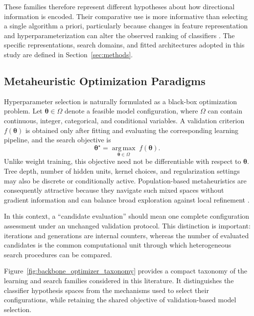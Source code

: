 These families therefore represent different hypotheses about how directional information is encoded. Their comparative use is more informative than selecting a single algorithm a priori, particularly because changes in feature representation and hyperparameterization can alter the observed ranking of classifiers \cite{nabipour2020predicting, mutinda2026hybrid}. The specific representations, search domains, and fitted architectures adopted in this study are defined in Section~\ref{sec:methods}.

\subsection{Metaheuristic Optimization Paradigms}\label{subsec:metaheuristic_paradigms}

Hyperparameter selection is naturally formulated as a black-box optimization problem. Let $\boldsymbol{\theta} \in \Omega$ denote a feasible model configuration, where $\Omega$ can contain continuous, integer, categorical, and conditional variables. A validation criterion $f(\boldsymbol{\theta})$ is obtained only after fitting and evaluating the corresponding learning pipeline, and the search objective is
\begin{equation}\label{eq:metaheuristic_objective}
\boldsymbol{\theta}^{\star} = \underset{\boldsymbol{\theta} \in \Omega}{\operatorname{arg\,max}}\; f(\boldsymbol{\theta}).
\end{equation}
Unlike weight training, this objective need not be differentiable with respect to $\boldsymbol{\theta}$. Tree depth, number of hidden units, kernel choices, and regularization settings may also be discrete or conditionally active. Population-based metaheuristics are consequently attractive because they navigate such mixed spaces without gradient information and can balance broad exploration against local refinement \cite{jovanovic2024wann, faris2018gwo_review, rajwar2023exhaustive_review}.

In this context, a “candidate evaluation” should mean one complete configuration assessment under an unchanged validation protocol. This distinction is important: iterations and generations are internal counters, whereas the number of evaluated candidates is the common computational unit through which heterogeneous search procedures can be compared.

Figure~\ref{fig:backbone_optimizer_taxonomy} provides a compact taxonomy of the learning and search families considered in this literature. It distinguishes the classifier hypothesis spaces from the mechanisms used to select their configurations, while retaining the shared objective of validation-based model selection.

